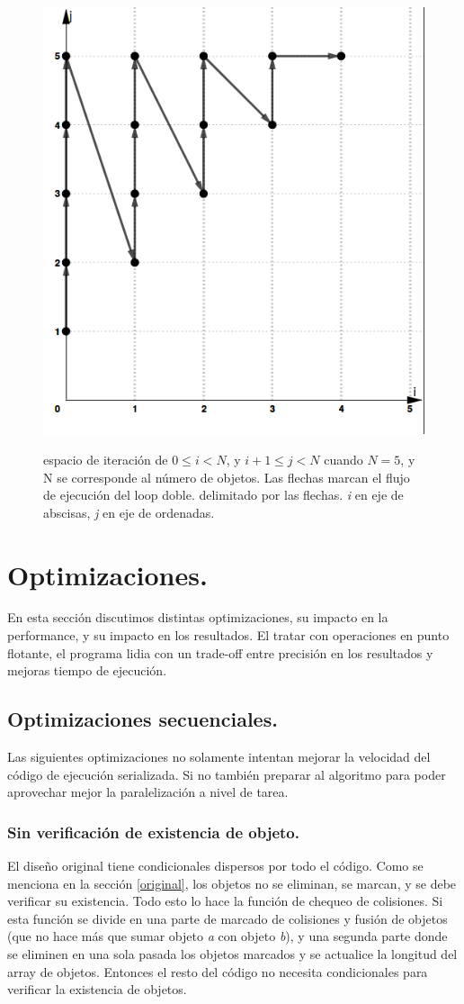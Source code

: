 \documentclass{article}
\begin{document}
\begin{figure}[h!]
	\centering
	\includegraphics[width=0.5\linewidth,height=0.5\textwidth]{resources/loop_anidado_no_tiling_505x565.png}
	\label{fig:no_tiling}
	\caption{espacio de iteración de $0\leq{i} < {N}$, y $i+1\leq{j} < {N}$
		cuando ${N}=5$, y N se corresponde al número de objetos. Las flechas marcan el flujo de ejecución del loop doble.
		delimitado por las flechas. \textit{i} en eje de abscisas, \textit{j} en eje de ordenadas.}
\end{figure}

\section{Optimizaciones.\label{opt}}

En esta sección discutimos distintas optimizaciones, su impacto en la performance,
y su impacto en los resultados. El tratar con operaciones en punto flotante, el programa
lidia con un trade-off entre precisión en los resultados y mejoras tiempo de ejecución.

\subsection{Optimizaciones secuenciales.\label{opt_seq}}
Las siguientes optimizaciones no solamente intentan mejorar la velocidad
del código de ejecución serializada. Si no también preparar al algoritmo
para poder aprovechar mejor la paralelización a nivel de tarea.

\subsubsection{Sin verificación de existencia de objeto.\label{no_if}}

El diseño original tiene condicionales dispersos por todo el código. Como se menciona en
la sección \ref{original}, los objetos no se eliminan, se marcan, y se debe verificar su existencia.
Todo esto lo hace la función de chequeo de colisiones. Si esta función se divide en una parte de marcado
de colisiones y fusión de objetos (que no hace más que sumar objeto \textit{a} con objeto \textit{b}), y
una segunda parte donde se eliminen en una sola pasada los objetos marcados y se actualice la longitud
del array de objetos. Entonces el resto del código no necesita condicionales para verificar la existencia de objetos.
\end{document}
